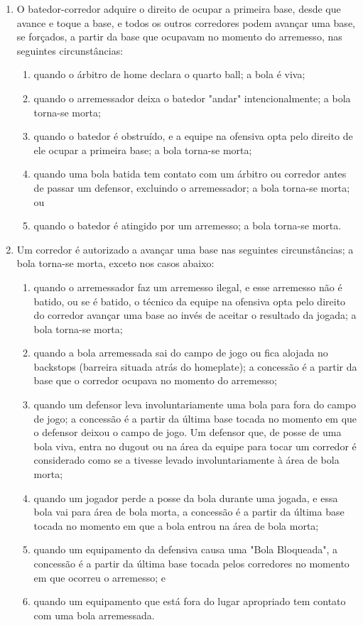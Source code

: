 		\begin{enumerate}[label=\roman*.]
		\item O batedor-corredor adquire o direito de ocupar a primeira base, desde que avance e toque a base, e todos os outros corredores podem avançar uma base, se forçados, a partir da base que ocupavam no momento do arremesso, nas seguintes circunstâncias:

		\begin{enumerate}[label=\arabic*)]
		 	\item quando o árbitro de \gls{home} declara o quarto \gls{ball}; a bola é viva;
			\item quando o arremessador deixa o batedor "andar" intencionalmente; a bola torna-se morta;
			\item  quando o batedor é obstruído, e a equipe na ofensiva opta pelo direito de ele ocupar a primeira base; a bola torna-se morta;
			\item  quando uma bola batida tem contato com um árbitro ou corredor antes de passar um defensor, excluindo o arremessador; a bola torna-se morta; ou
			\item  quando o batedor é atingido por um arremesso; a bola torna-se morta.
		\end{enumerate}
		\item Um corredor é autorizado a avançar uma base nas seguintes circunstâncias; a bola torna-se morta, exceto nos casos abaixo:

		\begin{enumerate}[label=\arabic*)]
			 	\item quando o arremessador faz um arremesso ilegal, e esse arremesso não é batido, ou se é batido, o técnico da equipe na ofensiva opta pelo direito do corredor avançar uma base ao invés de aceitar o resultado da jogada; a bola torna-se morta;
				\item  quando a bola arremessada sai do campo de jogo ou fica alojada no \glspl{backstop} (barreira situada atrás do \gls{homeplate}); a concessão é a partir da base que o corredor ocupava no momento do arremesso;
				\item  quando um defensor leva involuntariamente uma bola para fora do campo de jogo; a concessão é a partir da última base tocada no momento em que o defensor deixou o campo de jogo. Um defensor que, de posse de uma bola viva, entra no \gls{dugout} ou na área da equipe para tocar um corredor é considerado como se a tivesse levado involuntariamente à área de bola morta;
				\item  quando um jogador perde a posse da bola durante uma jogada, e essa bola vai para área de bola morta, a concessão é a partir da última base tocada no momento em que a bola entrou na área de bola morta;
				\item  quando um equipamento da defensiva causa uma "Bola Bloqueada", a concessão é a partir da última base tocada pelos corredores no momento em que ocorreu o arremesso; e
				\item  quando um equipamento que está fora do lugar apropriado tem contato com uma bola arremessada.


\end{enumerate}
\end{enumerate}
